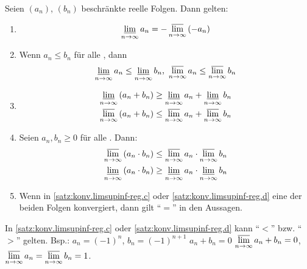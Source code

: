 \documentclass[12pt]{scrreprt}
\begin{document}
\begin{satz}
  \label{satz:konv.limsupinf-reg}
  Seien $(a_n)$, $(b_n)$ beschränkte reelle Folgen. Dann gelten:
  \begin{enumerate}
  \item \label{satz:konv.limsupinf-reg.a}
    \[ \varliminf_{n\rightarrow\infty}{a_n} = - \varlimsup_{n\rightarrow\infty}{(-a_n)} \]
  \item \label{satz:konv.limsupinf-reg.b}
    Wenn $a_n\le b_n$ für alle , dann
    \[ \varliminf_{n\rightarrow\infty}{a_n}\le\varliminf_{n\rightarrow\infty}{b_n} \text{, }
    \varlimsup_{n\rightarrow\infty}{a_n}\le\varlimsup_{n\rightarrow\infty}{b_n} \]
  \item \label{satz:konv.limsupinf-reg.c}
    \begin{align*}
      \varliminf_{n\rightarrow\infty}{(a_n+b_n)}&\ge\varliminf_{n\rightarrow\infty}{a_n}+\varliminf_{n\rightarrow\infty}{b_n}\\
      \varlimsup_{n\rightarrow\infty}{(a_n+b_n)}&\le\varlimsup_{n\rightarrow\infty}{a_n}+\varlimsup_{n\rightarrow\infty}{b_n}
    \end{align*}
  \item \label{satz:konv.limsupinf-reg.d}
    Seien $a_n, b_n \ge 0$ für alle . Dann:
    \begin{align*}
      \varlimsup_{n\rightarrow\infty}{(a_n\cdot b_n)} &\le
      \varlimsup_{n\rightarrow\infty}{a_n}\cdot\varlimsup_{n\rightarrow\infty}{b_n}\\
      \varliminf_{n\rightarrow\infty}{(a_n\cdot b_n)} &\ge
      \varliminf_{n\rightarrow\infty}{a_n}\cdot\varliminf_{n\rightarrow\infty}{b_n}
    \end{align*}
  \item \label{satz:konv.limsupinf-reg.e}
    Wenn in \ref{satz:konv.limsupinf-reg.c} oder
    \ref{satz:konv.limsupinf-reg.d} eine der beiden Folgen
    konvergiert, dann gilt "`$=$"' in den Aussagen.
  \end{enumerate}
\end{satz}
\begin{bem*}
  In \ref{satz:konv.limsupinf-reg.c} oder
  \ref{satz:konv.limsupinf-reg.d} kann "`$<$"' bzw. "`$>$"'
  gelten. Bsp.: $a_n=(-1)^n$, $b_n=(-1)^{n+1}$ \folgt $a_n+b_n=0$
  \folgt $\varlimsup\limits_{n\rightarrow\infty}{a_n+b_n}=0$,
  $\varlimsup\limits_{n\rightarrow\infty}{a_n}=\varlimsup\limits_{n\rightarrow\infty}{b_n}=1$.
\end{bem*}
\end{document}
